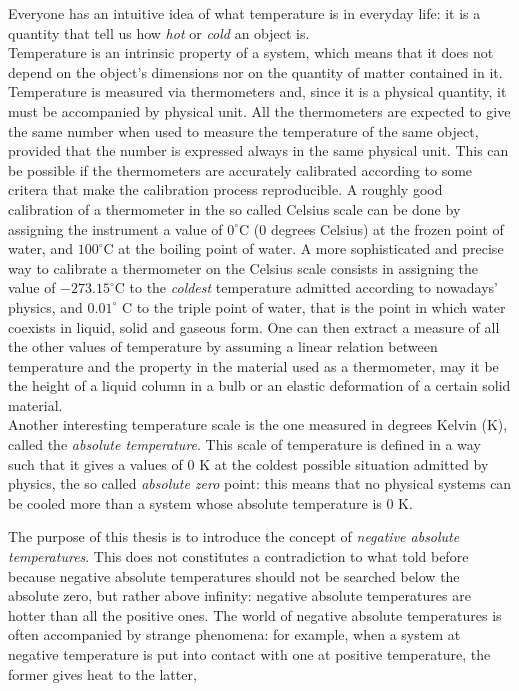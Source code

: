 Everyone has an intuitive idea of what temperature is in everyday life: it is a quantity that tell us how \emph{hot} or \emph{cold} an object is. \\
Temperature is an intrinsic property of a system, which means that it does not depend on the object's dimensions nor on the quantity of matter contained in it. \\
Temperature is measured via thermometers and, since it is a physical quantity, it must be accompanied by physical unit. All the thermometers are expected to give the same number when used to measure the temperature of the same object, provided that 
the number is expressed always in the same physical unit. This can be possible if the thermometers are accurately calibrated according to some critera that make the calibration process reproducible. 
A roughly good calibration of a thermometer in the so called Celsius scale can be done by assigning the instrument a value of $0^\circ$C (0 degrees Celsius) at the frozen point of water, and $100^\circ$C at the boiling point of water. A more sophisticated and precise way to calibrate a thermometer 
on the Celsius scale consists in assigning the value of $-273.15^\circ$C to the \emph{coldest} temperature admitted according to nowadays' physics, and $0.01^\circ$ C to the triple point of water, that 
is the point in which water coexists in liquid, solid and gaseous form. One can then extract a measure of all the other values of temperature by assuming a linear relation between temperature and the property in the material used as a thermometer,
may it be the height of a liquid column in a bulb or an elastic deformation of a certain solid material. \\
Another interesting temperature scale is the one measured in degrees Kelvin (K), called the \emph{absolute temperature}. This scale of temperature is 
defined in a way such that it gives a values of $0$ K at the coldest possible situation admitted by physics, the so called \emph{absolute zero} point: this means that no physical systems can be cooled more than a system 
whose absolute temperature is $0$ K. \par
\vspace{10pt}
The purpose of this thesis is to introduce the concept of \emph{negative absolute temperatures}. This does not constitutes a contradiction to what told before because negative absolute temperatures should not be searched below the absolute zero, but rather 
above infinity: negative absolute temperatures are hotter than all the positive ones. The world of negative absolute temperatures is often accompanied by strange phenomena: for example, when a system at negative temperature is put into contact with one at positive temperature, the former gives heat to the latter,
